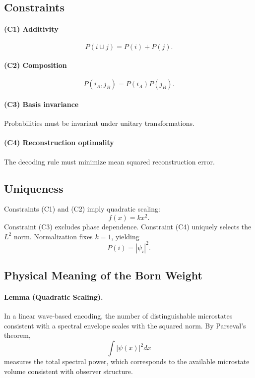 \documentclass[11pt]{article}
\begin{document}
\subsection{Constraints}

\paragraph{(C1) Additivity}
\[
P(i \cup j) = P(i) + P(j).
\]

\paragraph{(C2) Composition}
\[
P(i_A,j_B) = P(i_A)P(j_B).
\]

\paragraph{(C3) Basis invariance}
Probabilities must be invariant under unitary transformations.

\paragraph{(C4) Reconstruction optimality}
The decoding rule must minimize mean squared reconstruction error.

\subsection{Uniqueness}

Constraints (C1) and (C2) imply quadratic scaling:
\[
f(x) = kx^2.
\]
Constraint (C3) excludes phase dependence.
Constraint (C4) uniquely selects the \(L^2\) norm.
Normalization fixes \(k=1\), yielding
\[
P(i) = |\psi_i|^2.
\]

\subsection{Physical Meaning of the Born Weight}

\paragraph{Lemma (Quadratic Scaling).}
In a linear wave-based encoding, the number of distinguishable microstates
consistent with a spectral envelope scales with the squared norm.
By Parseval's theorem,
\[
\int |\psi(x)|^2 dx
\]
measures the total spectral power, which corresponds to the available
microstate volume consistent with observer structure.
\end{document}
